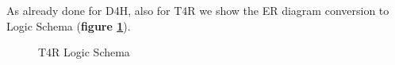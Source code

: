 As already done for D4H, also for T4R we show the ER diagram conversion to Logic Schema (\textbf{figure \ref{fig:T4R-Logic-Schema}}).

\begin{figure}[H]
    \centering
    \caption{T4R Logic Schema}
    \label{fig:T4R-Logic-Schema}
\end{figure}